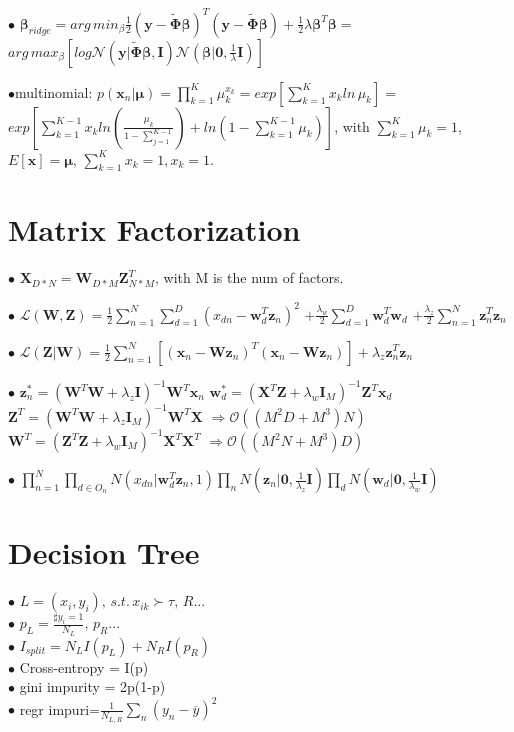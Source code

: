 \documentclass[10pt,a4paper,landscape]{article}
\renewcommand{\bf}[1]{\ensuremath{\mathbf{#1}}}
\newcommand{\bbeta}{\boldsymbol\beta}
\newcommand{\bPhi}{\boldsymbol\Phi}
\begin{document}
\begin{multicols*}{6}
$\bullet$ $\bbeta_{ridge} = arg \, min_\beta \frac{1}{2}(\bf{y}-\tilde{\bPhi}\bbeta)^T(\bf{y}-\tilde{\bPhi}\bbeta)+\frac{1}{2}\lambda\bbeta^T\bbeta=$\\
$arg \, max_\beta[log\mathcal{N}(\bf{y}|\tilde{\bPhi}\bbeta,\bf{I})\mathcal{N}(\bbeta|\bf{0}, \frac{1}{\lambda}\bf{I})]$

$\bullet$multinomial: $p(\bf{x}_n|\boldsymbol\mu)=\prod_{k=1}^K\mu_k^{x_k}=exp[\sum_{k=1}^Kx_kln\,\mu_k]=$
$exp[\sum_{k=1}^{K-1}x_kln(\frac{\mu_k}{1-\sum_{j=1}^{K-1}}) + ln(1-\sum_{k=1}^{K-1}\mu_k)]$, with $\sum_{k=1}^{K}\mu_k=1$, $E[\bf{x}]=\boldsymbol\mu$,
$\sum_{k=1}^{K}x_k=1, x_k=1$.

\section{Matrix Factorization}
$\bullet$ $\bf{X}_{D*N}=\bf{W}_{D*M}\bf{Z}_{N*M}^T$, with M is the num of factors.

$\bullet$ $\bf{\mathcal{L}}(\bf{W},\bf{Z})=\frac{1}{2}\sum_{n=1}^N\sum_{d=1}^D(x_{dn}-\bf{w}_d^T\bf{z}_n)^2$
$+\frac{\lambda_w}{2}\sum_{d=1}^D\bf{w}_d^T\bf{w}_d$
$+\frac{\lambda_z}{2}\sum_{n=1}^N\bf{z}_n^T\bf{z}_n$

$\bullet$ $\bf{\mathcal{L}}(\bf{Z}|\bf{W})=\frac{1}{2}\sum_{n=1}^N[(\bf{x}_n-\bf{W}\bf{z}_n)^T(\bf{x}_n-\bf{W}\bf{z}_n)]+\lambda_z\bf{z}_n^T\bf{z}_n$

$\bullet$ $\bf{z}_n^*=(\bf{W}^T\bf{W}+\lambda_z\bf{I})^{-1}\bf{W}^T\bf{x}_n$
$\bf{w}_d^*=(\bf{X}^T\bf{Z}+\lambda_w\bf{I}_M)^{-1}\bf{Z}^T\bf{x}_d$
$\bf{Z}^T=(\bf{W}^T\bf{W}+\lambda_z\bf{I}_M)^{-1}\bf{W}^T\bf{X}$
 $\Rightarrow\mathcal{O}((M^2D+M^3)N)$
$\bf{W}^T=(\bf{Z}^T\bf{Z}+\lambda_w\bf{I}_M)^{-1}\bf{X}^T\bf{X}^T$
 $\Rightarrow\mathcal{O}((M^2N+M^3)D)$
 
$\bullet$ $\prod_{n=1}^N\prod_{d\in O_n}N(x_{dn}|\bf{w}_d^T\bf{z}_n,1)\prod_nN(\bf{z}_n|\bf{0},\frac{1}{\lambda_z}\bf{I})\prod_dN(\bf{w}_d|\bf{0},\frac{1}{\lambda_w}\bf{I})$

\section{Decision Tree}
$\bullet$ $L=(x_i,y_i),\, s.t. \, x_{ik}\succ \tau, \, R... $\\
$\bullet$ $p_L=\frac{\sharp y_i=1}{N_L},\, p_R...$\\
$\bullet$ $I_{split} = N_L I(p_L)+N_RI(p_R)$\\
$\bullet$ Cross-entropy = I(p)\\
$\bullet$ gini impurity = 2p(1-p)\\
$\bullet$ regr impuri=$\frac{1}{N_{L,R}}\sum_n(y_n-\overline{y})^2$ 












\end{multicols*}
\end{document}
